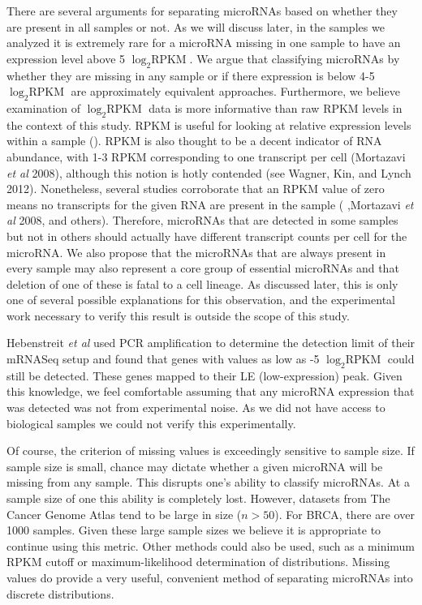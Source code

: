 \documentclass[12pt]{report}
\begin{document}
  There are several arguments for separating microRNAs based on whether they are present in all samples or not. As we will discuss later, in the samples we analyzed it is extremely rare
  for a microRNA missing in one sample to have an expression level above 5 $\log_{2} \text{RPKM}$. We argue that classifying microRNAs by whether they are missing in any sample or if there expression
  is below 4-5 $\log_{2} \text{RPKM}$ are approximately equivalent approaches. Furthermore, we believe examination of $\log_{2} \text{RPKM}$ data is more informative than raw RPKM levels in the context
  of this study. RPKM is useful for looking at relative expression levels within a sample (). RPKM is also thought to be a decent indicator of RNA abundance, with 1-3 RPKM corresponding to one transcript
  per cell (Mortazavi \textit{et al} 2008), although this notion is hotly contended (see Wagner, Kin, and Lynch 2012). Nonetheless, several studies corroborate that an RPKM value of zero
  means no transcripts for the given RNA are present in the sample (\cite{Hebenstreit2011} ,Mortazavi \textit{et al} 2008, and others). Therefore, microRNAs that are detected in some samples but not
  in others should actually have different transcript counts per cell for the microRNA. We also propose that the microRNAs that are always present in every sample may also represent a core group of essential
  microRNAs and that deletion of one of these is fatal to a cell lineage. As discussed later, this is only one of several possible explanations for this observation, and the experimental work necessary
  to verify this result is outside the scope of this study. %
  
  
  Hebenstreit \emph{et al} used PCR amplification to determine the detection limit of their mRNASeq setup and found that
  genes with values as low as -5 $\log_{2} \text{RPKM}$ could still be detected. These genes mapped to their LE (low-expression) peak. Given this knowledge, we feel comfortable assuming that any microRNA expression that was detected
  was not from experimental noise. As we did not have access to biological samples we could not verify this experimentally.
  
  Of course, the criterion of missing values is exceedingly sensitive to sample size. If sample size is small, chance may dictate whether a given microRNA will be missing from any sample. This disrupts one's ability
  to classify microRNAs. At a sample size of one this ability is completely lost. However, datasets from The Cancer Genome Atlas tend to be large in size ($n > 50$). For BRCA, there are over 1000 samples. Given these
  large sample sizes we believe it is appropriate to continue using this metric. Other methods could also be used, such as a minimum RPKM cutoff or maximum-likelihood determination of distributions. Missing values
  do provide a very useful, convenient method of separating microRNAs into discrete distributions. %
  
\end{document}
